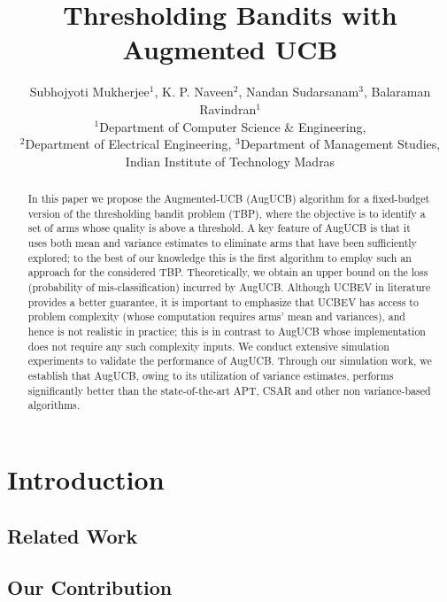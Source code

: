 \documentclass{article}
\title{Thresholding Bandits with Augmented UCB}
\author{Subhojyoti Mukherjee${}^1$, K. P. Naveen${}^2$, Nandan
Sudarsanam${}^3$, Balaraman Ravindran${}^1$\\
${}^1$Department of Computer Science \& Engineering,\\ ${}^2$Department of Electrical Engineering,
${}^3$Department of Management Studies,\\ Indian Institute of
Technology Madras}
\begin{document}
\maketitle


\vspace*{2mm}
\begin{abstract}
In this paper we propose the Augmented-UCB (AugUCB) algorithm for a fixed-budget version of the thresholding bandit problem (TBP), where the objective is to identify a set of arms whose quality is above a threshold. A key feature of AugUCB is that it uses both mean and variance estimates to eliminate arms that have been sufficiently explored; to the best of our knowledge this is the first algorithm to employ such an approach for the considered TBP.  Theoretically, we obtain an upper bound on the loss (probability of mis-classification) incurred by AugUCB. Although UCBEV in literature provides a better guarantee, it is important to emphasize that UCBEV has access to problem complexity (whose computation requires arms' mean and variances), and hence is not realistic in practice; this is in contrast to AugUCB whose implementation does not require any such complexity inputs. We conduct extensive simulation experiments to validate the performance of AugUCB. Through our simulation work, we establish that AugUCB, owing to its utilization of variance estimates, performs significantly better than the state-of-the-art APT, CSAR and other non variance-based algorithms.
\end{abstract}


\section{Introduction}
\label{intro}


\subsection{Related Work}
\label{prevRes}


\subsection{Our Contribution}
\label{contribution}

%
%
%
%
\vspace*{-1em}
\end{document}
